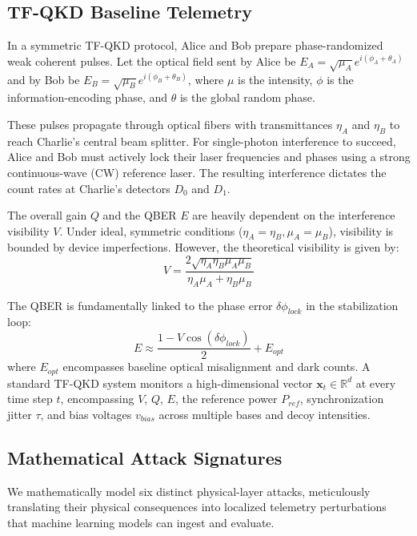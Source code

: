 \documentclass[10pt, journal, letterpaper, twocolumn]{IEEEtran}
\begin{document}
\subsection{TF-QKD Baseline Telemetry}
In a symmetric TF-QKD protocol, Alice and Bob prepare phase-randomized weak coherent pulses. Let the optical field sent by Alice be $E_A = \sqrt{\mu_A} e^{i(\phi_A + \theta_A)}$ and by Bob be $E_B = \sqrt{\mu_B} e^{i(\phi_B + \theta_B)}$, where $\mu$ is the intensity, $\phi$ is the information-encoding phase, and $\theta$ is the global random phase.

These pulses propagate through optical fibers with transmittances $\eta_A$ and $\eta_B$ to reach Charlie's central beam splitter. For single-photon interference to succeed, Alice and Bob must actively lock their laser frequencies and phases using a strong continuous-wave (CW) reference laser. The resulting interference dictates the count rates at Charlie's detectors $D_0$ and $D_1$.

The overall gain $Q$ and the QBER $E$ are heavily dependent on the interference visibility $V$. Under ideal, symmetric conditions ($\eta_A = \eta_B, \mu_A = \mu_B$), visibility is bounded by device imperfections. However, the theoretical visibility is given by:
\begin{equation}
V = \frac{2 \sqrt{\eta_A \eta_B \mu_A \mu_B}}{\eta_A \mu_A + \eta_B \mu_B}
\end{equation}

The QBER is fundamentally linked to the phase error $\delta \phi_{lock}$ in the stabilization loop:
\begin{equation}
E \approx \frac{1 - V \cos(\delta \phi_{lock})}{2} + E_{opt}
\end{equation}
where $E_{opt}$ encompasses baseline optical misalignment and dark counts. A standard TF-QKD system monitors a high-dimensional vector $\mathbf{x}_t \in \mathbb{R}^d$ at every time step $t$, encompassing $V$, $Q$, $E$, the reference power $P_{ref}$, synchronization jitter $\tau$, and bias voltages $v_{bias}$ across multiple bases and decoy intensities.

\subsection{Mathematical Attack Signatures}
We mathematically model six distinct physical-layer attacks, meticulously translating their physical consequences into localized telemetry perturbations that machine learning models can ingest and evaluate.
\end{document}
